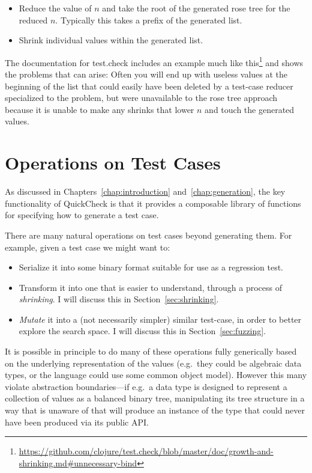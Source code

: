 \begin{itemize}
\item Reduce the value of \(n\) and take the root of the generated rose tree for the reduced \(n\).
Typically this takes a prefix of the generated list.
\item Shrink individual values within the generated list.
\end{itemize}

The documentation for test.check includes an example much like this\footnote{\url{https://github.com/clojure/test.check/blob/master/doc/growth-and-shrinking.md\#unnecessary-bind}} and shows the problems that can arise:
Often you will end up with useless values at the beginning of the list that could easily have been deleted by a test-case reducer specialized to the problem,
but were unavailable to the rose tree approach because it is unable to make any shrinks that lower \(n\) and touch the generated values.

\chapter{Operations on Test Cases}

As discussed in Chapters~\ref{chap:introduction} and~\ref{chap:generation},
the key functionality of QuickCheck is that it provides a composable library of functions for specifying how to generate a test case.

There are many natural operations on test cases beyond generating them.
For example,
given a test case we might want to:

\begin{itemize}
\item Serialize it into some binary format suitable for use as a regression test.
\item Transform it into one that is easier to understand,
through a process of \emph{shrinking}.
I will discuss this in Section~\ref{sec:shrinking}.
\item \emph{Mutate} it into a (not necessarily simpler) similar test-case,
in order to better explore the search space. I will discuss this in Section~\ref{sec:fuzzing}.
\end{itemize}

It is possible in principle to do many of these operations fully generically based on the underlying representation of the values (e.g.~they could be algebraic data types,
or the language could use some common object model).
However this many violate abstraction boundaries---if
e.g.\ a data type is designed to represent a collection of values as a balanced binary tree,
manipulating its tree structure in a way that is unaware of that will produce an instance of the type that could never have been produced via its public API.\ 

